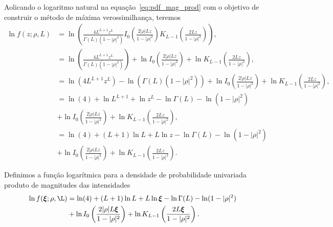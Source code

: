 
Aolicando  o logaritmo natural na equação~\eqref{eq:pdf_mag_prod} com o objetivo de construir o método de máxima verossimilhança, teremos
\begin{equation}\nonumber
\begin{split}
	\ln f(z;\rho,L)&=\ln\left(\frac{4L^{L+1}z^L}{\Gamma(L)(1-|\rho|^2)}I_0\left(\frac{2|\rho|Lz}{1-|\rho|^2}\right)K_{L-1}\left(\frac{2Lz}{1-|\rho|^2}\right)\right),\\
	&=\ln\left(\frac{4L^{L+1}z^L}{\Gamma(L)(1-|\rho|^2)}\right)+\ln I_0\left(\frac{2|\rho|Lz}{1-|\rho|^2}\right)+ \ln K_{L-1}\left(\frac{2Lz}{1-|\rho|^2}\right),\\
	&=\ln (4L^{L+1}z^L)-\ln(\Gamma(L)(1-|\rho|^2))+\ln I_0\left(\frac{2|\rho|Lz}{1-|\rho|^2}\right)+ \ln K_{L-1}\left(\frac{2Lz}{1-|\rho|^2}\right),\\
     &=\ln (4)+\ln L^{L+1}+\ln z^L-\ln\Gamma(L)-\ln(1-|\rho|^2)\\
     &+\ln I_0\left(\frac{2|\rho|Lz}{1-|\rho|^2}\right)+ \ln K_{L-1}\left(\frac{2Lz}{1-|\rho|^2}\right),\\
	&=\ln (4)+(L+1)\ln L+L\ln z-\ln\Gamma(L)-\ln(1-|\rho|^2)\\
	&+\ln I_0\left(\frac{2|\rho|Lz}{1-|\rho|^2}\right)+ \ln K_{L-1}\left(\frac{2Lz}{1-|\rho|^2}\right).
		\end{split}
\end{equation}

Definimos a função logarítmica para a densidade de probabilidade univariada produto de magnitudes das intensidades
\begin{equation}\label{eq:log_vero_mag_produto}
\begin{split}
	\ln f(\bm\xi; \rho,\L)&=\ln (4)+(L+1)\ln L+L\ln \bm\xi-\ln\Gamma(L)-\ln(1-|\rho|^2)\\
	                      &+\ln I_0\left(\frac{2|\rho|L\bm\xi}{1-|\rho|^2}\right)+ \ln K_{L-1}\left(\frac{2L\bm\xi}{1-|\rho|^2}\right).
	\end{split}
\end{equation}

